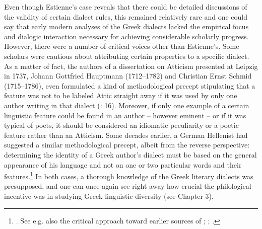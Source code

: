 Even though Estienne’s case reveals that there could be detailed discussions of the validity of certain dialect rules, this remained relatively rare and one could say that early modern analyses of the Greek dialects lacked the empirical focus and dialogic interaction necessary for achieving considerable scholarly progress. However, there were a number of critical voices other than Estienne’s. Some scholars were cautious about attributing certain properties to a specific dialect. As a matter of fact, the authors of a dissertation on Atticism presented at Leipzig in 1737, Johann Gottfried Hauptmann (1712–1782) and Christian Ernst Schmid (1715–1786), even formulated a kind of methodological precept stipulating that a feature was not to be labeled Attic straight away if it was used by only one author writing in that dialect (\citealt{Hauptmann1737}: 16). Moreover, if only one example of a certain linguistic feature could be found in an author – however eminent – or if it was typical of poets, it should be considered an idiomatic peculiarity or a poetic feature rather than an Atticism. Some decades earlier, a German Hellenist had suggested a similar methodological precept, albeit from the reverse perspective: determining the identity of a Greek author’s dialect must be based on the general appearance of his language and not on one or two particular words and their features.\footnote{\citet[495--496]{Ursin1691}. See e.g. also the critical approach toward earlier sources of \citet{Walper1589}; \citet[(.3\textsc{\textsuperscript{r}})]{Portus1603}; \citet[10-12]{Gedike1782}.} In both cases, a thorough knowledge of the Greek literary dialects was presupposed, and one can once again see right away how crucial the philological incentive was in studying Greek linguistic diversity (see Chapter 3).


